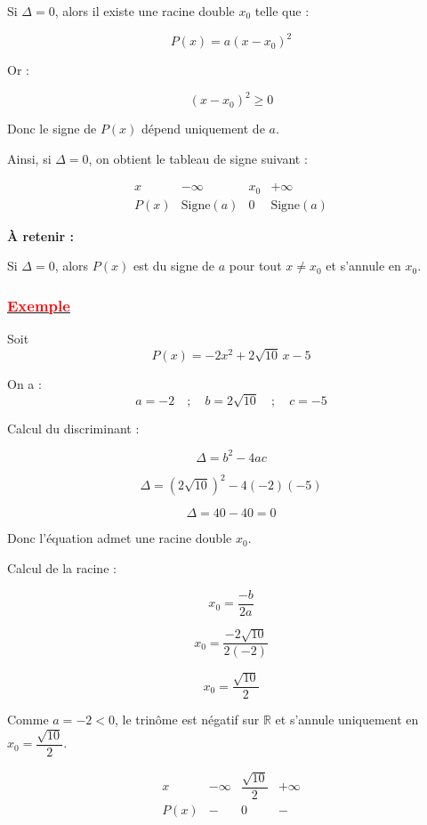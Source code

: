 \documentclass[12pt,a4paper]{article}
\begin{document}
Si $\Delta = 0$, alors il existe une racine double $x_0$ telle que :

\[
P(x)=a(x-x_0)^2
\]

Or :

\[
(x-x_0)^2 \geq 0
\]

Donc le signe de $P(x)$ dépend uniquement de $a$.

\bigskip

Ainsi, si $\Delta = 0$, on obtient le tableau de signe suivant :

\[
\begin{array}{c|ccc}
x & -\infty & x_0 & +\infty \\
\hline
P(x) & \text{Signe}(a) & 0 & \text{Signe}(a)
\end{array}
\]

\bigskip

\textbf{À retenir :}

Si $\Delta = 0$, alors $P(x)$ est du signe de $a$ pour tout $x \neq x_0$  
et s'annule en $x_0$.
\subsubsection*{\underline{\textcolor{red}{Exemple}}}

Soit 
\[
P(x) = -2x^2 + 2\sqrt{10}\,x - 5
\]

On a :
\[
a=-2 \quad ; \quad b=2\sqrt{10} \quad ; \quad c=-5
\]

\medskip

Calcul du discriminant :

\[
\Delta = b^2 - 4ac
\]

\[
\Delta = (2\sqrt{10})^2 - 4(-2)(-5)
\]

\[
\Delta = 40 - 40 = 0
\]

Donc l’équation admet une racine double $x_0$.

\medskip

Calcul de la racine :

\[
x_0 = \frac{-b}{2a}
\]

\[
x_0 = \frac{-2\sqrt{10}}{2(-2)}
\]

\[
x_0 = \frac{\sqrt{10}}{2}
\]

\bigskip

Comme $a=-2<0$, le trinôme est négatif sur $\mathbb{R}$ 
et s’annule uniquement en $x_0=\dfrac{\sqrt{10}}{2}$.

\[
\begin{array}{c|ccc}
x & -\infty & \dfrac{\sqrt{10}}{2} & +\infty \\
\hline
P(x) & - & 0 & -
\end{array}
\]
\end{document}
